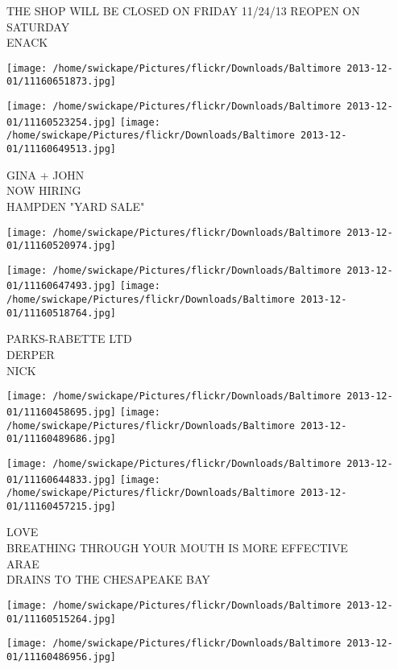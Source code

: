 \documentclass[10pt,letterpaper]{article}
\begin{document}
THE SHOP WILL BE CLOSED ON FRIDAY 11/24/13 REOPEN ON SATURDAY\\
ENACK
\pagebreak

\texttt{[image: /home/swickape/Pictures/flickr/Downloads/Baltimore 2013-12-01/11160651873.jpg]}

\vspace{0.25in}
\texttt{[image: /home/swickape/Pictures/flickr/Downloads/Baltimore 2013-12-01/11160523254.jpg]}
\texttt{[image: /home/swickape/Pictures/flickr/Downloads/Baltimore 2013-12-01/11160649513.jpg]}

GINA + JOHN\\
NOW HIRING\\
HAMPDEN "YARD SALE"
\pagebreak

\texttt{[image: /home/swickape/Pictures/flickr/Downloads/Baltimore 2013-12-01/11160520974.jpg]}

\vspace{0.25in}
\texttt{[image: /home/swickape/Pictures/flickr/Downloads/Baltimore 2013-12-01/11160647493.jpg]}
\texttt{[image: /home/swickape/Pictures/flickr/Downloads/Baltimore 2013-12-01/11160518764.jpg]}

PARKS{-}RABETTE LTD\\
DERPER\\
NICK
\pagebreak

\texttt{[image: /home/swickape/Pictures/flickr/Downloads/Baltimore 2013-12-01/11160458695.jpg]}
\texttt{[image: /home/swickape/Pictures/flickr/Downloads/Baltimore 2013-12-01/11160489686.jpg]}

\texttt{[image: /home/swickape/Pictures/flickr/Downloads/Baltimore 2013-12-01/11160644833.jpg]}
\texttt{[image: /home/swickape/Pictures/flickr/Downloads/Baltimore 2013-12-01/11160457215.jpg]}

LOVE\\
BREATHING THROUGH YOUR MOUTH IS MORE EFFECTIVE\\
ARAE\\
DRAINS TO THE CHESAPEAKE BAY
\pagebreak

\texttt{[image: /home/swickape/Pictures/flickr/Downloads/Baltimore 2013-12-01/11160515264.jpg]}

\vspace{0.25in}
\texttt{[image: /home/swickape/Pictures/flickr/Downloads/Baltimore 2013-12-01/11160486956.jpg]}
\end{document}
